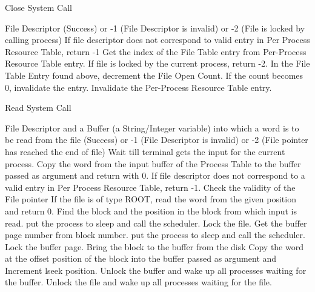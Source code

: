 
\begin{algorithm}
\caption{Close System Call}
\begin{algorithmic}
\REQUIRE File Descriptor
 (Success) or -1 (File Descriptor is invalid) or -2 (File is locked by calling process)
\STATE If file descriptor does not correspond to valid entry in Per Process Resource Table, return -1   
\STATE Get the index of the File Table entry from Per-Process Resource Table entry.
\STATE If file is locked by the current process, return -2.   
\STATE In the File Table Entry found above, decrement the File Open Count. If the count becomes 0, invalidate the entry.  
\STATE Invalidate the Per-Process Resource Table entry.    
\end{algorithmic}
\end{algorithm}


\begin{algorithm}
\caption{Read System Call}
\begin{algorithmic}
\REQUIRE File Descriptor and a Buffer (a String/Integer variable) into which a word is to be read from the file
 (Success) or -1 (File Descriptor is invalid) or -2 (File pointer has reached the end of file)
    \STATE Wait till terminal gets the input for the current process.
    \STATE Copy the word from the input buffer of the Process Table to the buffer passed as argument and return with 0. 
\ENDIF
\STATE If file descriptor does not correspond to a valid entry in Per Process Resource Table, return -1.
\STATE Check the validity of the File pointer
\STATE If the file is of type ROOT, read the word from the given position and return 0.
\STATE Find the block and the position in the block from which input is read.
    \STATE put the process to sleep and call the scheduler.
\ENDWHILE
\STATE Lock the file.
\STATE Get the buffer page number from block number.
    \STATE put the process to sleep and call the scheduler.
\ENDWHILE 
\STATE Lock the buffer page.
    \STATE Bring the block to the buffer from the disk
\ENDIF 
\STATE Copy the word at the offset position of the block into the buffer passed as argument and Increment lseek position.
\STATE Unlock the buffer and wake up all processes waiting for the buffer.
\STATE Unlock the file and wake up all processes waiting for the file.
\end{algorithmic}
\end{algorithm}

